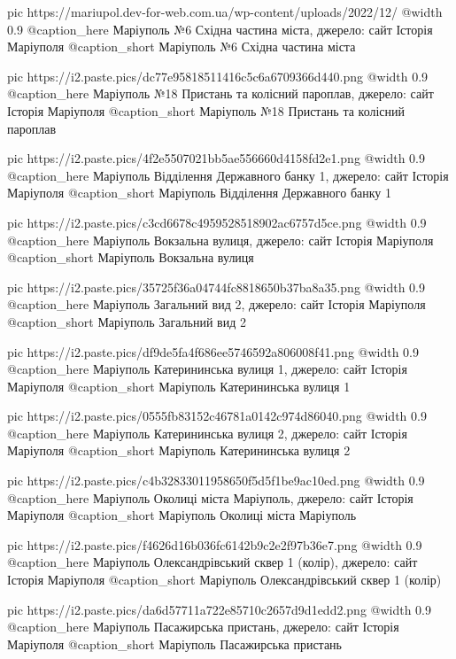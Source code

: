 	pic https://mariupol.dev-for-web.com.ua/wp-content/uploads/2022/12/%
	@width 0.9
	@caption_here Маріуполь №6 Східна частина міста, джерело: сайт Історія Маріуполя
	@caption_short Маріуполь №6 Східна частина міста

	pic https://i2.paste.pics/dc77e95818511416c5c6a6709366d440.png
	@width 0.9
	@caption_here Маріуполь №18 Пристань та колісний пароплав, джерело: сайт Історія Маріуполя
	@caption_short Маріуполь №18 Пристань та колісний пароплав

	pic https://i2.paste.pics/4f2e5507021bb5ae556660d4158fd2e1.png
	@width 0.9
	@caption_here Маріуполь Відділення Державного банку 1, джерело: сайт Історія Маріуполя
	@caption_short Маріуполь Відділення Державного банку 1

	pic https://i2.paste.pics/c3cd6678c4959528518902ac6757d5ce.png
	@width 0.9
	@caption_here Маріуполь Вокзальна вулиця, джерело: сайт Історія Маріуполя
	@caption_short Маріуполь Вокзальна вулиця

	pic https://i2.paste.pics/35725f36a04744fc8818650b37ba8a35.png
	@width 0.9
	@caption_here Маріуполь Загальний вид 2, джерело: сайт Історія Маріуполя
	@caption_short Маріуполь Загальний вид 2

	pic https://i2.paste.pics/df9de5fa4f686ee5746592a806008f41.png
	@width 0.9
	@caption_here Маріуполь Катерининська вулиця 1, джерело: сайт Історія Маріуполя
	@caption_short Маріуполь Катерининська вулиця 1

	pic https://i2.paste.pics/0555fb83152c46781a0142c974d86040.png
	@width 0.9
	@caption_here Маріуполь Катерининська вулиця 2, джерело: сайт Історія Маріуполя
	@caption_short Маріуполь Катерининська вулиця 2

	pic https://i2.paste.pics/c4b32833011958650f5d5f1be9ac10ed.png
	@width 0.9
	@caption_here Маріуполь Околиці міста Маріуполь, джерело: сайт Історія Маріуполя
	@caption_short Маріуполь Околиці міста Маріуполь

	pic https://i2.paste.pics/f4626d16b036fc6142b9c2e2f97b36e7.png
	@width 0.9
	@caption_here Маріуполь Олександрівський сквер 1 (колір), джерело: сайт Історія Маріуполя
	@caption_short Маріуполь Олександрівський сквер 1 (колір)

	pic https://i2.paste.pics/da6d57711a722e85710c2657d9d1edd2.png
	@width 0.9
	@caption_here Маріуполь Пасажирська пристань, джерело: сайт Історія Маріуполя
	@caption_short Маріуполь Пасажирська пристань

